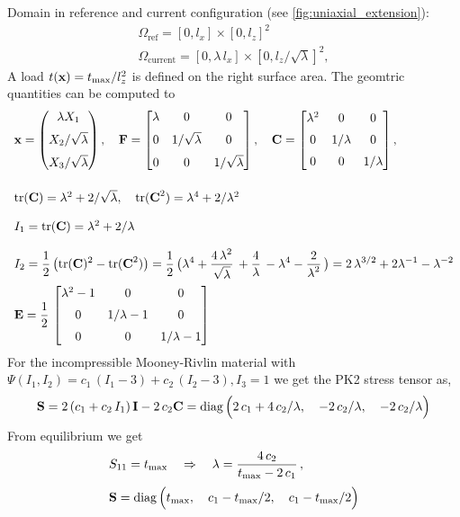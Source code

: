 Domain in reference and current configuration (see \cref{fig:uniaxial_extension}):
\begin{equation*}
  \begin{array}{lll}
    \Omega_\text{ref} = [0, l_x] \times [0, l_z]^2\\[4mm]
    \Omega_\text{current} = [0, \lambda\,l_x] \times [0, l_z/\sqrt{\lambda}]^2,
  \end{array}
\end{equation*}
A load $t(\textbf{x}) = t_\text{max}/l_z^2$ is defined on the right surface area. The geomtric quantities can be computed to
\begin{equation*}
  \begin{array}{lll}
    \textbf{x} = \left(\begin{matrix}\lambda X_1\\[2mm] X_2/\sqrt{\lambda} \\[2mm] X_3/\sqrt{\lambda}\end{matrix}\right), 
    \quad \textbf{F} = \left[\begin{matrix}\lambda & 0 & 0\\[2mm] 0 & 1/\sqrt{\lambda} & 0 \\[2mm] 0 & 0 & 1/\sqrt{\lambda}\end{matrix}\right],
    \quad \textbf{C} = \left[\begin{matrix}\lambda^2 & 0 & 0\\[2mm] 0 & 1/\lambda & 0 \\[2mm] 0 & 0 & 1/\lambda \end{matrix}\right],\\[12mm]
    \mathrm{tr}(\textbf{C}) = \lambda^2 + 2/\sqrt{\lambda}, \quad \mathrm{tr}(\textbf{C}^2) = \lambda^4 + 2/\lambda^2\\[4mm]
    I_1 = \mathrm{tr}(\textbf{C}) = \lambda^2 + 2/\lambda \quad \\[4mm]
    I_2 = \displaystyle\frac{\displaystyle{1}}{\displaystyle{2}}\,\big(\mathrm{tr}(\textbf{C})^2 - \mathrm{tr}(\textbf{C}^2)\big) 
    = \displaystyle\frac{\displaystyle{1}}{\displaystyle{2}}\,\big(\lambda^4 + \displaystyle\frac{\displaystyle{4\,\lambda^2}}{\displaystyle{\sqrt{\lambda}}}\, + \displaystyle\frac{\displaystyle{4}}{\displaystyle{\lambda}}\, - \lambda^4 - \displaystyle\frac{\displaystyle{2}}{\displaystyle{\lambda^2}}\,\big)
    = 2\,\lambda^{3/2} + 2\lambda^{-1} - \lambda^{-2}\\[4mm]
    \textbf{E} = \displaystyle\frac{\displaystyle{1}}{\displaystyle{2}}\,\left[\begin{matrix}\lambda^2-1 & 0 & 0\\[2mm] 0 & 1/\lambda-1 & 0 \\[2mm] 0 & 0 & 1/\lambda-1\end{matrix}\right]
  \end{array}
\end{equation*}
For the incompressible Mooney-Rivlin material with $\Psi(I_1,I_2) = c_1\,(I_1-3) + c_2\,(I_2 - 3), I_3 = 1$ we get the PK2 stress tensor as,
\begin{equation*}
  \begin{array}{lll}
    \textbf{S} = 2\,(c_1 + c_2\,I_1)\,\textbf{I} - 2\,c_2\textbf{C} = \hbox{diag} \,\Big(2\,c_1 + 4\,c_2/\lambda,\quad -2\,c_2/\lambda, \quad -2\,c_2/\lambda\Big)
  \end{array}
\end{equation*}
From equilibrium we get
\begin{equation*}
  \begin{array}{lll}
    S_{11} = t_\text{max} \quad \Rightarrow \quad \lambda = \displaystyle\frac{\displaystyle{4\,c_2}}{\displaystyle{t_\text{max} - 2\,c_1}}\,,\\[4mm]
    \textbf{S} = \hbox{diag} \,\Big( t_\text{max}, \quad  c_1-t_\text{max}/2, \quad c_1-t_\text{max}/2 \Big)
  \end{array}
\end{equation*}

